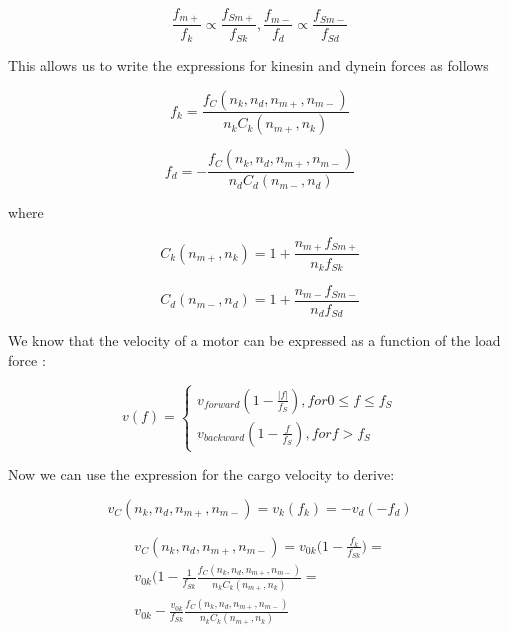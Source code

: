 \begin{equation}
\frac{f_{m+}}{f_k} \propto \frac{f_{Sm+}}{f_{Sk}}, 
\frac{f_{m-}}{f_d} \propto \frac{f_{Sm-}}{f_{Sd}}
\end{equation}

This allows us to write the expressions for kinesin and dynein forces as follows

\begin{equation}
f_k = \frac{f_C(n_k, n_d, n_{m+}, n_{m-})}{n_kC_k(n_{m+}, n_k)}
\end{equation}

\begin{equation}
f_d = -\frac{f_C(n_k, n_d, n_{m+}, n_{m-})}{n_dC_d(n_{m-},n_d)}
\end{equation}

where

\begin{equation}
C_k(n_{m+}, n_k) = 1 + \frac{n_{m+}f_{Sm+}}{n_kf_{Sk}}
\end{equation}

\begin{equation}
C_d(n_{m-},n_d) = 1 + \frac{n_{m-}f_{Sm-}}{n_df_{Sd}}
\end{equation}

We know that the velocity of a motor can be expressed as a function of the load force \cite{muller2008tug}:

\begin{equation}
v(f) = \left\{ \begin{aligned}
v_{forward} (1 - \frac{|f|}{f_S}), for 0 \leq  f \leq f_S\\
v_{backward} (1 - \frac{f}{f_S}), for f > f_S
\end{aligned}\right.
\end{equation}

Now we can use the expression for the cargo velocity to derive:

\begin{equation}
v_C(n_k, n_d, n_{m+}, n_{m-}) = v_k(f_k) = - v_d(-f_d)
\end{equation}

\begin{equation}
\begin{split}
v_C(n_k, n_d, n_{m+}, n_{m-}) = v_{0k}\big(1-\frac{f_k}{f_{Sk}}\big) =\\
v_{0k}\big(1-\frac{1}{f_{Sk}}\frac{f_C(n_k, n_d, n_{m+}, n_{m-})}{n_kC_k(n_{m+}, n_k)} = \\
v_{0k}-\frac{v_{0k}}{f_{Sk}}\frac{f_C(n_k, n_d, n_{m+}, n_{m-})}{n_kC_k(n_{m+}, n_k)}
\end{split}
\end{equation}

